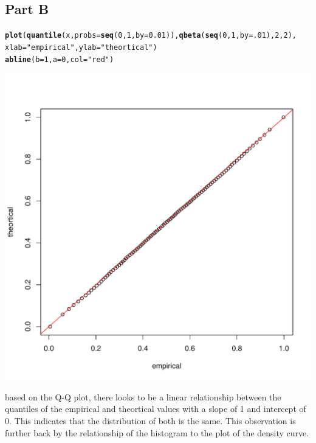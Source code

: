 \documentclass{article}\usepackage[]{graphicx}\usepackage[]{color}
\makeatletter
\newcommand{\hlnum}[1]{\textcolor[rgb]{0.686,0.059,0.569}{#1}}%
\newcommand{\hlstr}[1]{\textcolor[rgb]{0.192,0.494,0.8}{#1}}%
\newcommand{\hlstd}[1]{\textcolor[rgb]{0.345,0.345,0.345}{#1}}%
\newcommand{\hlkwc}[1]{\textcolor[rgb]{0.333,0.667,0.333}{#1}}%
\newcommand{\hlkwd}[1]{\textcolor[rgb]{0.737,0.353,0.396}{\textbf{#1}}}%
\newenvironment{kframe}{%
 \def\at@end@of@kframe{}%
 \ifinner\ifhmode%
  \def\at@end@of@kframe{\end{minipage}}%
  \begin{minipage}{\columnwidth}%
 \fi\fi%
 \def\FrameCommand##1{\hskip\@totalleftmargin \hskip-\fboxsep
 \colorbox{shadecolor}{##1}\hskip-\fboxsep
     \hskip-\linewidth \hskip-\@totalleftmargin \hskip\columnwidth}%
 \MakeFramed {\advance\hsize-\width
   \@totalleftmargin\z@ \linewidth\hsize
   \@setminipage}}%
 {\par\unskip\endMakeFramed%
 \at@end@of@kframe}
\newenvironment{knitrout}{}{} %
\makeatother
\begin{document}
\subsection*{Part B}
\begin{knitrout}
\color{fgcolor}\begin{kframe}
\begin{alltt}
\hlkwd{plot}\hlstd{(}\hlkwd{quantile}\hlstd{(x,} \hlkwc{probs} \hlstd{=} \hlkwd{seq}\hlstd{(}\hlnum{0}\hlstd{,}\hlnum{1}\hlstd{,} \hlkwc{by} \hlstd{=} \hlnum{0.01}\hlstd{)),} \hlkwd{qbeta}\hlstd{(}\hlkwd{seq}\hlstd{(}\hlnum{0}\hlstd{,}\hlnum{1}\hlstd{,}\hlkwc{by} \hlstd{=} \hlnum{.01}\hlstd{),}\hlnum{2}\hlstd{,}\hlnum{2}\hlstd{),}
     \hlkwc{xlab} \hlstd{=} \hlstr{"empirical"}\hlstd{,} \hlkwc{ylab} \hlstd{=} \hlstr{"theortical"}\hlstd{)}
\hlkwd{abline}\hlstd{(}\hlkwc{b}\hlstd{=}\hlnum{1}\hlstd{,}\hlkwc{a}\hlstd{=}\hlnum{0}\hlstd{,} \hlkwc{col} \hlstd{=} \hlstr{"red"}\hlstd{)}
\end{alltt}
\end{kframe}
\includegraphics[width=0.60\linewidth]{figure/unnamed-chunk-5-1} 

\end{knitrout}
based on the Q-Q plot, there looks to be a linear relationship between the quantiles of the empirical and theortical values with a slope of 1 and intercept of 0. This indicates that the distribution of both is the same. This observation is further back by the relationship of the histogram to the plot of the density curve.  
\end{document}
